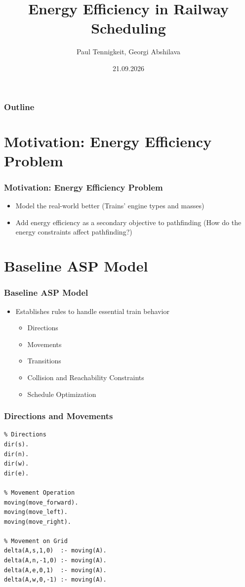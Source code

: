 \documentclass{beamer}
\title{Energy Efficiency in Railway Scheduling}
\author{Paul Tennigkeit, Georgi Abshilava}
\institute{Universität Potsdam}
\date{21.09.2026}
\begin{document}
\frame{\titlepage}

\begin{frame}
\frametitle{Outline}
\tableofcontents
\end{frame}

\section{Motivation: Energy Efficiency Problem}
\begin{frame}
\frametitle{Motivation: Energy Efficiency Problem}
\begin{itemize}
  \item Model the real-world better (Trains' engine types and masses)
  \item Add energy efficiency as a secondary objective to pathfinding (How do the energy constraints affect pathfinding?)
\end{itemize}
\end{frame}

\section{Baseline ASP Model}
\begin{frame}
\frametitle{Baseline ASP Model}
\begin{itemize}
  \item Establishes rules to handle essential train behavior
  \begin{itemize}
    \item Directions
    \item Movements
    \item Transitions
    \item Collision and Reachability Constraints
    \item Schedule Optimization
  \end{itemize}
\end{itemize}
\end{frame}

\begin{frame}[fragile]
\frametitle{Directions and Movements}
  \begin{verbatim}
% Directions
dir(s).
dir(n).
dir(w).
dir(e).
  
% Movement Operation
moving(move_forward).
moving(move_left).
moving(move_right).
  
% Movement on Grid
delta(A,s,1,0)  :- moving(A).
delta(A,n,-1,0) :- moving(A).
delta(A,e,0,1)  :- moving(A).
delta(A,w,0,-1) :- moving(A).
  \end{verbatim}
\end{frame}
\end{document}
